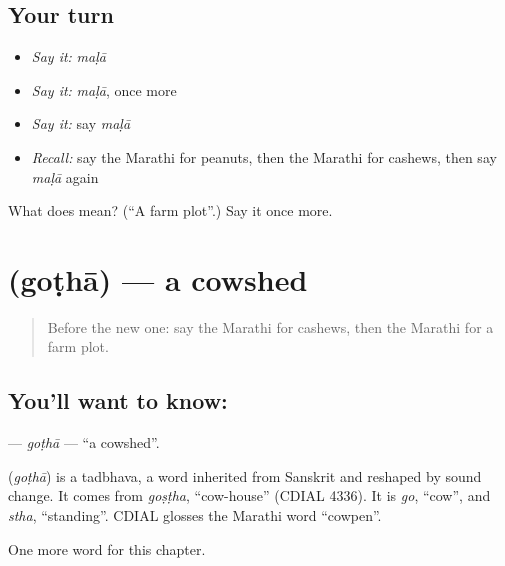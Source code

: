 \subsection*{Your turn}
\begin{itemize}
\raggedright
  \item \emph{Say it:} \emph{maḷā}
  \item \emph{Say it:} \emph{maḷā}, once more
  \item \emph{Say it:} say \emph{maḷā}
  \item \emph{Recall:} say the Marathi for peanuts, then the Marathi for cashews, then say \emph{maḷā} again
\end{itemize}

\begin{tcolorbox}[breakable,colback=teal!4,colframe=teal!35!black,title={Before you move on}]
What does  mean? (\textquotedblleft{}A farm plot\textquotedblright{}.) Say it once more.
\end{tcolorbox}
\section[\texorpdfstring{\mr{गोठा} (goṭhā)}{गोठा (goṭhā)}]{ (goṭhā) — a cowshed}

\label{lesson:MR-C245-gotha}



\begin{quote}
Before the new one: say the Marathi for cashews, then the Marathi for a farm plot.
\end{quote}

\subsection*{You'll want to know: }
\textbf{} — \emph{goṭhā} — \textquotedblleft{}a cowshed\textquotedblright{}.

\begin{cousinweb}
\textbf{} (\emph{goṭhā}) is a tadbhava, a word inherited from Sanskrit and reshaped by sound change. It comes from \emph{goṣṭha}, \textquotedblleft{}cow-house\textquotedblright{} (CDIAL 4336). It is \emph{go}, \textquotedblleft{}cow\textquotedblright{}, and \emph{stha}, \textquotedblleft{}standing\textquotedblright{}. CDIAL glosses the Marathi word \textquotedblleft{}cowpen\textquotedblright{}.
\end{cousinweb}

\begin{grammarlens}[title={What you've built}]
One more word for this chapter.
\end{grammarlens}

